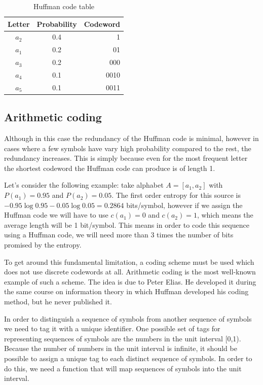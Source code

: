 \begin{table}
\caption{Huffman code table}
\centering
\begin{tabular}{ccr}
\toprule
Letter & Probability & Codeword \\
\midrule
$a_2$ & 0.4 & 1 \\
$a_1$ & 0.2 & 01 \\
$a_3$ & 0.2 & 000 \\
$a_4$ & 0.1 & 0010 \\
$a_5$ & 0.1 & 0011 \\
\bottomrule
\end{tabular}
\label{tab:huffman2}
\end{table}

\subsection{Arithmetic coding}
Although in this case the redundancy of the Huffman code is minimal, however in cases where a few symbols have vary high probability compared to the rest, the redundancy increases. This is simply because even for the most frequent letter the shortest codeword the Huffman code can produce is of length 1.

Let's consider the following example: take alphabet $A=[a_1, a_2]$ with $P(a_1) = 0.95$ and $P(a_2) = 0.05$. The first order entropy for this source is $-0.95 \log 0.95 - 0.05 \log 0.05 = 0.2864$ bits/symbol, however if we assign the Huffman code we will have to use $c(a_1)=0$ and $c(a_2)=1$, which means the average length will be 1 bit/symbol. This means in order to code this sequence using a Huffman code, we will need more than 3 times the number of bits promised by the entropy.

To get around this fundamental limitation, a coding scheme must be used which does not use discrete codewords at all. Arithmetic coding is the most well-known example of such a scheme. The idea is due to Peter Elias. He developed it during the same course on information theory in which Huffman developed his coding method, but he never published it.

In order to distinguish a sequence of symbols from another sequence of symbols we need to
tag it with a unique identifier. One possible set of tags for representing sequences of symbols
are the numbers in the unit interval [0,1). Because the number of numbers in the unit interval
is infinite, it should be possible to assign a unique tag to each distinct sequence of symbols. In
order to do this, we need a function that will map sequences of symbols into the unit interval.

